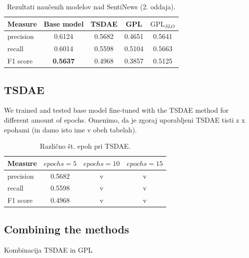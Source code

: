 \documentclass[fleqn,moreauthors,10pt]{ds_report}
\begin{document}
\begin{table}[!h]
	\footnotesize
	\begin{center}
		\begin{tabular}{ |l|c|c|c|c| }
		\hline
		\rowcolor{Red}Measure & Base model & TSDAE & GPL & $\text{GPL}_{SLO}$ \\
		\hline

		precision & 0.6124 & 0.5682 & 0.4651 & 0.5641 \\
		recall & 0.6014 & 0.5598 & 0.5104 & 0.5663 \\
		F1 score & \textbf{0.5637} & 0.4968 & 0.3857 & 0.5125 \\

		\hline
		\end{tabular}
	\end{center}
\caption{Rezultati naučenih modelov nad SentiNews \cite{sentiNews} (2. oddaja).}
\label{tab2}
\end{table}


\subsection*{TSDAE}
We trained and tested base model fine-tuned with the TSDAE method for different amount of epochs.
Omenimo, da je zgoraj uporabljeni TSDAE tisti z x epohami (in damo isto ime v obeh tabelah).

\begin{table}[!h]
	\footnotesize
	\begin{center}
		\begin{tabular}{ |l|c|c|c| }
		\hline
		\rowcolor{Red}Measure & $epochs=5$ & $epochs=10$ & $epochs=15$ \\
		\hline

		precision & 0.5682 & v & v\\
		recall & 0.5598 & v & v\\
		F1 score & 0.4968 & v & v\\

		\hline
		\end{tabular}
	\end{center}
\caption{Različno št. epoh pri TSDAE.}
\label{tab3}
\end{table}


\subsection*{Combining the methods}
Kombinacija TSDAE in GPL
\end{document}

